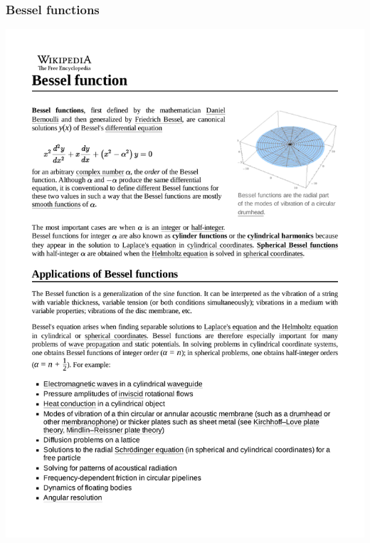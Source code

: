 \documentclass{beamer}
\begin{document}
\begin{frame}[fragile]
\frametitle{Bessel functions}
\includegraphics[page=1, clip, trim=0in 0in 0in 0in, width=\textwidth]{Bessel function.pdf}
\end{frame}
\end{document}
